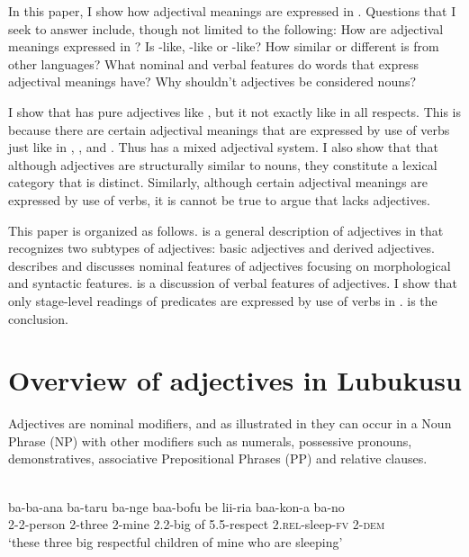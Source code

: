 \documentclass[output=paper,
modfonts
]{langscibook}
\begin{document}
In this paper, I show how adjectival meanings are expressed in . Questions that I seek to answer include, though not limited to the following: How are adjectival meanings expressed in ? Is  -like, -like or -like? How similar or different is  from other languages? What nominal and verbal features do words that express adjectival meanings have? Why shouldn’t  adjectives be considered nouns? 

I show that  has pure adjectives like , but it not exactly like  in all respects. This is because there are certain adjectival meanings that are expressed by use of verbs just like in , ,  and . Thus  has a mixed adjectival system. I also show that that although adjectives are structurally similar to nouns, they constitute a lexical category that is distinct. Similarly, although certain adjectival meanings are expressed by use of verbs, it is cannot be true to argue that  lacks adjectives.

This paper is organized as follows.  is a general description of adjectives in  that recognizes two  subtypes of adjectives: basic adjectives and derived adjectives.  describes and discusses nominal features of adjectives focusing on morphological and syntactic features.  is a discussion of verbal features of adjectives. I show that only stage-level readings of predicates are expressed by use of verbs in .  is the conclusion.

\section{Overview of adjectives in Lubukusu}\label{sec:wasike:2}

Adjectives are nominal modifiers, and as illustrated in  they can occur in a Noun Phrase (NP) with other modifiers such as numerals, possessive pronouns, demonstratives, associative Prepositional Phrases (PP) and relative clauses.

\ea\label{ex:wasike:4}
\\
\gll ba{\rmfnm}-ba-ana ba-taru ba-nge baa-bofu be lii-ria baa-kon-a       ba-no\\
     2-2{\rmfnm}-person     2-three  2-mine 2.2-big    of  5.5-respect     2.\textsc{rel}-sleep-\textsc{fv} 2-\textsc{dem}\\
\glt ‘these three big respectful children of mine who are sleeping’
\z
\end{document}
